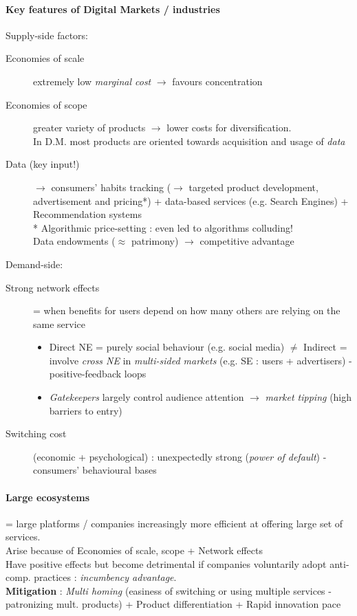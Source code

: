 \documentclass[10pt]{article}
\begin{document}
\paragraph{Key features of Digital Markets / industries} Supply-side factors:
\begin{description}
        \item[Economies of scale] extremely low \textit{marginal cost} $\rightarrow$ favours concentration
        \item[Economies of scope] greater variety of products $\rightarrow$ lower costs for diversification. 
        \\In D.M. most products are oriented towards acquisition and usage of \textit{data} 
        \item[Data (key input!)]$\rightarrow$ consumers' habits tracking ($\rightarrow$ targeted product development, advertisement and pricing*) + data-based services (e.g. Search Engines) + Recommendation systems
        \\* Algorithmic price-setting : even led to algorithms colluding!
        \\Data endowments ($\approx$ patrimony) $\rightarrow$ competitive advantage
\end{description}
Demand-side:
\begin{description}
    \item[Strong network effects] = when benefits for users depend on how many others are relying on the same service
    \begin{itemize}
        \item Direct NE = purely social behaviour (e.g. social media) $\neq$ Indirect = involve \textit{cross NE} in \textit{multi-sided markets} (e.g. SE : users + advertisers) - positive-feedback loops
        \item \textit{Gatekeepers} largely control audience attention $\rightarrow$ \textit{market tipping} (high barriers to entry)
    \end{itemize}
    \item[Switching cost] (economic + psychological) : unexpectedly strong (\textit{power of default}) - consumers' behavioural bases
\end{description}
\paragraph{Large ecosystems} = large platforms / companies increasingly more efficient at offering large set of services. \\Arise because of Economies of scale, scope + Network effects
\\Have positive effects but become detrimental if companies voluntarily adopt anti-comp. practices : \textit{incumbency advantage}.
\\\textbf{Mitigation} : \textit{Multi homing} (easiness of switching or using multiple services - patronizing mult. products) + Product differentiation + Rapid innovation pace
\end{document}
